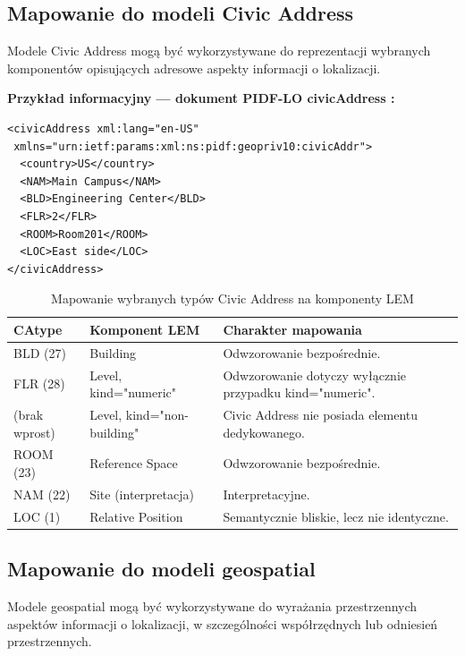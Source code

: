 \subsection{Mapowanie do modeli Civic Address}
\label{sec:mapowanie-civic}
Modele Civic Address mogą być wykorzystywane do reprezentacji wybranych komponentów opisujących adresowe aspekty informacji o lokalizacji.

\noindent \textbf{Przykład informacyjny --- dokument PIDF-LO civicAddress \cite{RFC5139}:}
\begin{verbatim}
<civicAddress xml:lang="en-US"
 xmlns="urn:ietf:params:xml:ns:pidf:geopriv10:civicAddr">
  <country>US</country>
  <NAM>Main Campus</NAM>
  <BLD>Engineering Center</BLD>
  <FLR>2</FLR>
  <ROOM>Room201</ROOM>
  <LOC>East side</LOC>
</civicAddress>
\end{verbatim}

\begin{table}[h]
\centering
\small
\begin{tabularx}{\textwidth}{|>{\raggedright\arraybackslash}p{2.2cm}|>{\raggedright\arraybackslash}p{3.3cm}|>{\raggedright\arraybackslash}X|}
\hline
\textbf{CAtype} & \textbf{Komponent LEM} & \textbf{Charakter mapowania} \\ \hline
BLD (27) & Building & Odwzorowanie bezpośrednie. \\ \hline
FLR (28) & Level, kind="numeric" & Odwzorowanie dotyczy wyłącznie przypadku kind="numeric". \\ \hline
(brak wprost) & Level, kind="non-building" & Civic Address nie posiada elementu dedykowanego. \\ \hline
ROOM (23) & Reference Space & Odwzorowanie bezpośrednie. \\ \hline
NAM (22) & Site (interpretacja) & Interpretacyjne. \\ \hline
LOC (1) & Relative Position & Semantycznie bliskie, lecz nie identyczne. \\ \hline
\end{tabularx}
\caption{Mapowanie wybranych typów Civic Address \cite{RFC4776} na komponenty LEM}
\end{table}

\subsection{Mapowanie do modeli geospatial}
\label{sec:mapowanie-geospatial}
Modele geospatial mogą być wykorzystywane do wyrażania przestrzennych aspektów informacji o lokalizacji, w szczególności współrzędnych lub odniesień przestrzennych.

